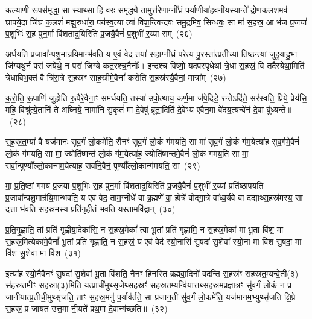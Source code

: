 क॒ल्या॒णी रू॒पस॑मृद्धा॒ सा स्या॒थ्सा हि वरः॒ समृ॑द्ध्यै॒ तामुत्त॑रे॒णाग्नी᳚ध्रं पर्या॒णीया॑हव॒नीय॒स्यान्ते᳚ द्रोणकल॒शमव॑ घ्रापये॒दा जि॑घ्र क॒लशं॑ मह्यु॒रुधा॑रा॒ पय॑स्व॒त्या त्वा॑ विश॒न्त्विन्द॑वः समु॒द्रमि॑व॒ सिन्ध॑वः॒ सा मा॑ स॒हस्र॒ आ भ॑ज प्र॒जया॑ प॒शुभिः॑ स॒ह पुन॒र्मा वि॑शताद्र॒यिरिति॑ प्र॒जयै॒वैनं॑ प॒शुभी॑ र॒य्या सम्~(२६)\ip

अ॒र्ध॒य॒ति॒ प्र॒जावा᳚न्पशु॒मान्र॑यि॒मान्भ॑वति॒ य ए॒वं वेद॒ तया॑ स॒हाग्नी᳚ध्रं प॒रेत्य॑ पु॒रस्ता᳚त्प्र॒तीच्यां॒ तिष्ठ॑न्त्यां जुहुयादु॒भा जि॑ग्यथु॒र्न परा॑ जयेथे॒ न परा॑ जिग्ये कत॒रश्च॒नैनोः᳚। इन्द्र॑श्च विष्णो॒ यदप॑स्पृधेथां त्रे॒धा स॒हस्रं॒ वि तदै॑रयेथा॒मिति॑ त्रेधाविभ॒क्तं वै त्रि॑रा॒त्रे स॒हस्रꣳ॑ साह॒स्रीमे॒वैनां᳚ करोति स॒हस्र॑स्यै॒वैनां॒ मात्रा᳚म्~(२७)\ip

क॒रो॒ति॒ रू॒पाणि॑ जुहोति रू॒पैरे॒वैना॒ꣳ॒ सम॑र्धयति॒ तस्या॑ उपो॒त्थाय॒ कर्ण॒मा ज॑पे॒दिडे॒ रन्ते\-ऽदि॑ते॒ सर॑स्वति॒ प्रिये॒ प्रेय॑सि॒ महि॒ विश्रु॑त्ये॒तानि॑ ते अघ्निये॒ नामा॑नि सु॒कृतं॑ मा दे॒वेषु॑ ब्रूता॒दिति॑ दे॒वेभ्य॑ ए॒वैन॒मा वे॑दय॒त्यन्वे॑नं दे॒वा बु॑ध्यन्ते॥~(२८)\ip

{\anuvakamend[{ए॒तदे॒तस्यां᳚ वी॒र्य॑मस्य त्रि॒भिश्च॑ द॒त्ता स॑हस्रत॒मी तस्मा॑दे॒व वरः॒ सं मात्रा॒मेका॒न्नच॑त्वारि॒ꣳ॒शच्च॑}]}

स॒ह॒स्र॒त॒म्या॑ वै यज॑मानः सुव॒र्गं लो॒कमे॑ति॒ सैनꣳ॑ सुव॒र्गं लो॒कं ग॑मयति॒ सा मा॑ सुव॒र्गं लो॒कं ग॑म॒येत्या॑ह सुव॒र्गमे॒वैनं॑ लो॒कं ग॑मयति॒ सा मा॒ ज्योति॑ष्मन्तं लो॒कं ग॑म॒येत्या॑ह॒ ज्योति॑ष्मन्तमे॒वैनं॑ लो॒कं ग॑मय॒ति सा मा॒ सर्वा॒न्पुण्याँ᳚ल्लो॒कान्ग॑म॒येत्या॑ह॒ सर्वा॑ने॒वैनं॒ पुण्याँ᳚ल्लो॒कान्ग॑मयति॒ सा~(२९)\ip

मा॒ प्र॒ति॒ष्ठां ग॑मय प्र॒जया॑ प॒शुभिः॑ स॒ह पुन॒र्मा वि॑शताद्र॒यिरिति॑ प्र॒जयै॒वैनं॑ प॒शुभी॑ र॒य्यां प्रति॑\-ष्ठापयति प्र॒जावा᳚न्पशु॒मान्र॑यि॒मान्भ॑वति॒ य ए॒वं वेद॒ ताम॒ग्नीधे॑ वा ब्र॒ह्मणे॑ वा॒ होत्रे॑ वोद्गा॒त्रे वा᳚ध्व॒र्यवे॑ वा दद्याथ्स॒हस्र॑मस्य॒ सा द॒त्ता भ॑वति स॒हस्र॑मस्य॒ प्रति॑गृहीतं भवति॒ यस्तामवि॑द्वान्~(३०)\ip

प्र॒ति॒गृ॒ह्णाति॒ तां प्रति॑ गृह्णीया॒देका॑सि॒ न स॒हस्र॒मेकां᳚ त्वा भू॒तां प्रति॑ गृह्णामि॒ न स॒हस्र॒मेका॑ मा भू॒ता वि॑श॒ मा स॒हस्र॒मित्येका॑मे॒वैनां᳚ भू॒तां प्रति॑ गृह्णाति॒ न स॒हस्रं॒ य ए॒वं वेद॑ स्यो॒नासि॑ सु॒षदा॑ सु॒शेवा᳚ स्यो॒ना मा वि॑श सु॒षदा॒ मा वि॑श सु॒शेवा॒ मा वि॑श~(३१)\ip

इत्या॑ह स्यो॒नैवैनꣳ॑ सु॒षदा॑ सु॒शेवा॑ भू॒ता वि॑शति॒ नैनꣳ॑ हिनस्ति ब्रह्मवा॒दिनो॑ वदन्ति स॒हस्र॑ꣳ सहस्रत॒म्यन्वे॒ती(३) स॑हस्रत॒मीꣳ स॒हस्रा(३)मिति॒ यत्प्राची॑मुथ्सृ॒जेथ्स॒हस्रꣳ॑ सहस्रत॒म्यन्वि॑या॒त्तथ्स॒हस्र॑मप्रज्ञा॒त्रꣳ सु॑व॒र्गं लो॒कं न प्र जा॑नीयात्प्र॒तीची॒मुथ्सृ॑जति॒ ताꣳ स॒हस्र॒मनु॑ प॒र्याव॑र्तते॒ सा प्र॑जान॒ती सु॑व॒र्गं लो॒कमे॑ति॒ यज॑मानम॒भ्युथ्सृ॑जति क्षि॒प्रे स॒हस्रं॒ प्र जा॑यत उत्त॒मा नी॒यते᳚ प्रथ॒मा दे॒वान्ग॑च्छति॥~(३२)\ip


